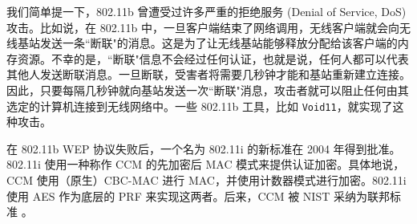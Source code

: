 \vspace*{-10pt}

\begin{snote}[攻击5: 拒绝服务。]
我们简单提一下，802.11b 曾遭受过许多严重的拒绝服务 (Denial of Service, DoS) 攻击。比如说，在 802.11b 中，一旦客户端结束了网络调用，无线客户端就会向无线基站发送一条``断联"的消息。这是为了让无线基站能够释放分配给该客户端的内存资源。不幸的是，``断联"信息不会经过任何认证，也就是说，任何人都可以代表其他人发送断联消息。一旦断联，受害者将需要几秒钟才能和基站重新建立连接。因此，只要每隔几秒钟就向基站发送一次``断联"消息，攻击者就可以阻止任何由其选定的计算机连接到无线网络中。一些 802.11b 工具，比如 \texttt{Void11}，就实现了这种攻击。
\end{snote}

\begin{snote}[802.11i。]
在 802.11b WEP 协议失败后，一个名为 802.11i 的新标准在 2004 年得到批准。802.11i 使用一种称作 CCM 的先加密后 MAC 模式来提供认证加密。具体地说，CCM 使用（原生）CBC-MAC 进行 MAC，并使用计数器模式进行加密。802.11i 使用 AES 作为底层的 PRF 来实现这两者。后来，CCM 被 NIST 采纳为联邦标准 \cite{dworkin2004sp}。
\end{snote}